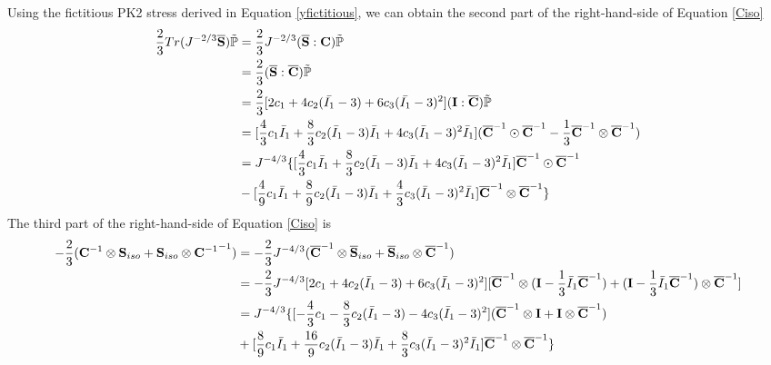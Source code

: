 Using the fictitious PK2 stress derived in Equation \ref{yfictitious}, we can obtain the second part of the right-hand-side of Equation \ref{Ciso}
\begin{equation} \label{ypart2}
\begin{split}
\frac{2}{3}Tr(J^{-2/3}\overline{\bold{S}})\tilde{\mathbb{P}} &= \frac{2}{3}J^{-2/3}(\overline{\bold{S}} : \bold{C})\tilde{\mathbb{P}} \\ 
&= \frac{2}{3} (\overline{\bold{S}} : \overline{\bold{C}})\tilde{\mathbb{P}} \\
&= \frac{2}{3} [2c_1 + 4c_2(\bar{I_1} - 3) + 6c_3(\bar{I_1} - 3)^2] (\bold{I} : \overline{\bold{C}})
\tilde{\mathbb{P}} \\
&= [\frac{4}{3}c_1{\bar{I}}_1 + \frac{8}{3}c_2({\bar{I}}_1 - 3){\bar{I}}_1 + 4c_3({\bar{I}}_1 - 3)^2{\bar{I}}_1]({\overline{\bold{C}}}^{-1} \odot {\overline{\bold{C}}}^{-1} - \frac{1}{3}{\overline{\bold{C}}}^{-1} \otimes {\overline{\bold{C}}}^{-1}) \\
&= J^{-4/3} \{ [\frac{4}{3}c_1{\bar{I}}_1 + \frac{8}{3}c_2({\bar{I}}_1 - 3){\bar{I}}_1 + 4c_3({\bar{I}}_1 - 3)^2{\bar{I}}_1]{\overline{\bold{C}}}^{-1} \odot {\overline{\bold{C}}}^{-1} \\
&-  [\frac{4}{9}c_1{\bar{I}}_1 + \frac{8}{9}c_2({\bar{I}}_1 - 3){\bar{I}}_1 + \frac{4}{3}c_3({\bar{I}}_1 - 3)^2{\bar{I}}_1]{\overline{\bold{C}}}^{-1} \otimes {\overline{\bold{C}}}^{-1} \} 
\end{split}
\end{equation}
The third part of the right-hand-side of Equation \ref{Ciso} is
\begin{equation} \label{ypart3}
\begin{split}
-\frac{2}{3}({\bold{C}}^{-1} \otimes {\bold{S}}_{iso} + {\bold{S}}_{iso} \otimes {{\bold{C}}^{-1}}^{-1}) 
&= 
-\frac{2}{3}J^{-4/3}({\overline{\bold{C}}}^{-1} \otimes {\overline{\bold{S}}}_{iso} + {\overline{\bold{S}}}_{iso} \otimes {\overline{{\bold{C}}}^{-1}}) \\
&=
-\frac{2}{3}J^{-4/3}[2c_1 + 4c_2({\bar{I}}_1 - 3) + 6c_3({\bar{I}}_1 - 3)^2]
[{\overline{\bold{C}}}^{-1} \otimes (\bold{I} - \frac{1}{3}{\bar{I}_1}{\overline{\bold{C}}}^{-1}) + 
(\bold{I} - \frac{1}{3}{\bar{I}_1}{\overline{\bold{C}}}^{-1}) \otimes {\overline{\bold{C}}}^{-1}]\\
&=
J^{-4/3} \{ [-\frac{4}{3}c_1 - \frac{8}{3}c_2({\bar{I}}_1 - 3) - 4c_3({\bar{I}}_1 - 3)^2] ({\overline{\bold{C}}}^{-1} \otimes \bold{I} + \bold{I} \otimes {\overline{\bold{C}}}^{-1}) \\
&+ [\frac{8}{9}c_1{\bar{I}}_1 + \frac{16}{9}c_2({\bar{I}}_1 - 3){\bar{I}}_1 + \frac{8}{3}c_3({\bar{I}}_1 - 3)^2{\bar{I}}_1 ] {\overline{\bold{C}}}^{-1} \otimes {\overline{\bold{C}}}^{-1}
\}
\end{split}
\end{equation}
